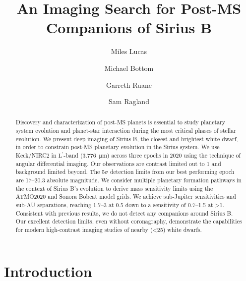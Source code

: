 \documentclass[twocolumn]{aastex631}
\newcommand\Lp{$\mathrm{L}^\prime$}
\begin{document}
\title{An Imaging Search for Post-MS Companions of Sirius B}



\author[0000-0001-6341-310X]{Miles Lucas}

\author[0000-0003-1341-5531]{Michael Bottom}

\author[0000-0003-4769-1665]{Garreth Ruane}

\author[0000-0002-0696-1780]{Sam Ragland}


\begin{abstract}
Discovery and characterization of post-MS planets is essential to study planetary system evolution and planet-star interaction during the most critical phases of stellar evolution. We present deep imaging of Sirius B, the closest and brightest white dwarf, in order to constrain post-MS planetary evolution in the Sirius system. We use Keck/NIRC2 in \Lp-band (\qty{3.776}{\micro\meter}) across three epochs in 2020 using the technique of angular differential imaging. Our observations are contrast limited out to \qty{1}{\au} and background limited beyond. The 5$\sigma$ detection limits from our best performing epoch are \numrange{17}{20.3} absolute magnitude. We consider multiple planetary formation pathways in the context of Sirius B's evolution to derive mass sensitivity limits using the ATMO2020 and Sonora Bobcat model grids. We achieve sub-Jupiter sensitivities and sub-AU separations, reaching \qtyrange{1.7}{3}{\jupitermass} at \qty{0.5}{\au} down to a sensitivity of \qtyrange{0.7}{1.5}{\jupitermass} at \textgreater\qty{1}{\au}. Consistent with previous results, we do not detect any companions around Sirius B. Our excellent detection limits, even without coronagraphy, demonstrate the capabilities for modern high-contrast imaging studies of nearby (\textless\qty{25}{\parsec}) white dwarfs.
\end{abstract}

\section{Introduction}\label{sec:intro}
\end{document}
